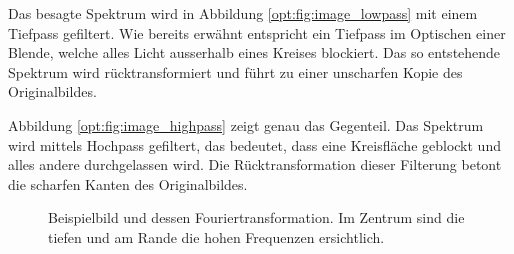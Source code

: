 Das besagte Spektrum wird in Abbildung \ref{opt:fig:image_lowpass} mit einem Tiefpass gefiltert.
Wie bereits erwähnt entspricht ein Tiefpass im Optischen einer Blende, welche alles Licht ausserhalb eines Kreises blockiert.
Das so entstehende Spektrum wird rücktransformiert und führt zu einer unscharfen Kopie des Originalbildes.

Abbildung \ref{opt:fig:image_highpass} zeigt genau das Gegenteil. 
Das Spektrum wird mittels Hochpass gefiltert, das bedeutet, dass eine Kreisfläche geblockt und alles andere durchgelassen wird.
Die Rücktransformation dieser Filterung betont die scharfen Kanten des Originalbildes. 

\begin{figure}
    \centering

    \caption{Beispielbild und dessen Fouriertransformation. Im Zentrum sind die tiefen und am Rande die hohen Frequenzen ersichtlich.}
    \label{opt:fig:image_raw}
\end{figure}


